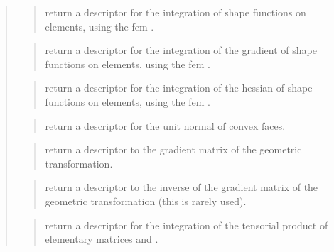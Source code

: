 \documentclass[a4paper,11pt,english]{sphinxmanual}
\begin{document}
\begin{quote}

\begin{quote}

return a descriptor for the integration of shape functions on
elements, using the fem .
\end{quote}

\begin{quote}

return a descriptor for the integration of the gradient of shape
functions on elements, using the fem .
\end{quote}

\begin{quote}

return a descriptor for the integration of the hessian of shape
functions on elements, using the fem .
\end{quote}

\begin{quote}

return a descriptor for the unit normal of convex faces.
\end{quote}

\begin{quote}

return a descriptor to the gradient matrix of the geometric
transformation.
\end{quote}

\begin{quote}

return a descriptor to the inverse of the gradient matrix of the
geometric transformation (this is rarely used).
\end{quote}

\begin{quote}

return a descriptor for the integration of the tensorial product of
elementary matrices  and .
\end{quote}
\end{quote}
\end{document}
